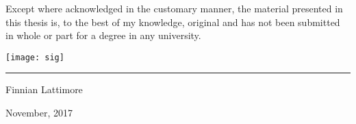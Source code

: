 \clearpage
\vspace*{\fill}
\begin{center}
\begin{minipage}{.9\textwidth}
Except where acknowledged in the customary manner, the material 
presented in this thesis is, to the best of my knowledge, original and has not been submitted in whole or part for a degree in any 
university.

\vspace{40mm}  %
\texttt{[image: sig]}
\hspace{80mm}\vspace{5mm}
\hspace{80mm}\rule{40mm}{.15mm}\par   %
\hspace{80mm} Finnian Lattimore\par
\hspace{80mm} November, 2017
\end{minipage}
\end{center}
\vfill %
\clearpage
